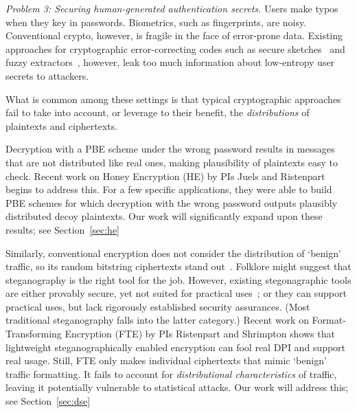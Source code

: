 \begin{newitemize}
\item{\em Problem 3: Securing human-generated authentication secrets.} Users make typos
when they key in passwords. Biometrics, such as fingerprints, are noisy.
Conventional crypto, however, is fragile in the face of error-prone data. 
Existing approaches for cryptographic error-correcting codes such as secure
sketches~\cite{} and fuzzy extractors~\cite{}, however, leak too much
information about low-entropy user secrets to attackers.
\end{newitemize}
What is common among these settings is that 
typical cryptographic approaches fail to take into account, or
leverage to their benefit, the \textit{distributions} of plaintexts and ciphertexts.

Decryption with a PBE scheme under the wrong password results in
messages that are not distributed like real ones, making plausibility
of plaintexts easy to check.  Recent work on Honey Encryption (HE) by PIs Juels and
Ristenpart begins to address this.  For a few specific applications,
they were able to build PBE schemes for which decryption with the wrong
password outputs plausibly distributed decoy plaintexts. 
Our work will significantly expand upon these results; see Section~\ref{sec:he}

Similarly, conventional encryption does not consider the distribution
of `benign' traffic, so its random bitstring ciphertexts stand
out~\cite{KBMP13}.  Folklore might suggest that steganography 
is the right tool for the job.  However, existing
stegonagraphic tools are either provably secure, yet not suited for
practical uses~\cite{Hopper:Provable_Stego}; or they can support
practical uses, but lack rigorously established security
assurances. (Most traditional steganography falls into the latter category.)
Recent work on Format-Transforming Encryption (FTE) by PIs Ristenpart
and Shrimpton shows that lightweight steganographically enabled
encryption can fool real DPI and support real usage.  Still, FTE only makes
{individual} ciphertexts that mimic `benign' traffic formatting.  
It fails to account for \textit{distributional characteristics} of
traffic, leaving it potentially vulnerable to statistical attacks.  
Our work will address this; see Section~\ref{sec:dse}


